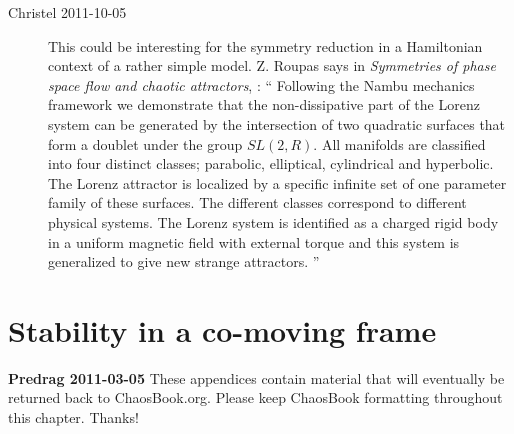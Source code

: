 \begin{description}
\item[Christel 2011-10-05 ] This could be interesting for the symmetry
reduction in a Hamiltonian context of a rather simple model.
Z. Roupas says in
\emph{Symmetries of phase space flow and chaotic attractors},
 : ``
Following the Nambu mechanics framework we demonstrate that the
non-dissipative part of the Lorenz system can be generated by the
intersection of two quadratic surfaces that form a doublet under the
group $SL(2,R)$. All manifolds are classified into four distinct classes;
parabolic, elliptical, cylindrical and hyperbolic. The Lorenz attractor
is localized by a specific infinite set of one parameter family of these
surfaces. The different classes correspond to different physical systems.
The Lorenz system is identified as a charged rigid body in a uniform
magnetic field with external torque and this system is generalized to
give new strange attractors.
''


\end{description}

\newpage
\section{Stability in a co-moving frame}
\label{sect:stabComoving}

{\bf Predrag 2011-03-05}
{These appendices contain material that will eventually be returned back to
    ChaosBook.org. Please keep ChaosBook formatting throughout this chapter.
    Thanks!}

